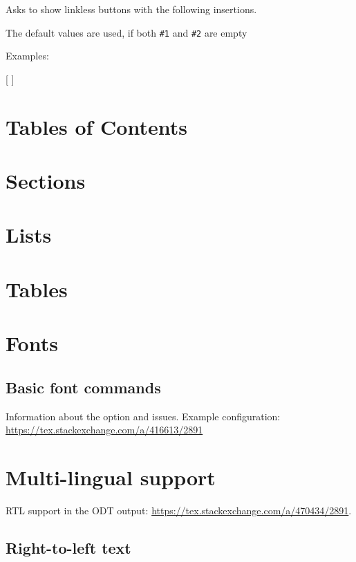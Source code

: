\documentclass{book}
\begin{document}
Asks to show linkless buttons with the following insertions.

The default values are used, if both \verb|#1| and \verb|#2| are empty

   Examples:

\begin{texsource}

    {[}
    {] }
\end{texsource}

\section{Tables of Contents}

\section{Sections}
\section{Lists}
\section{Tables}

\section{Fonts}
\subsection{Basic font commands}

Information about the  option and  issues. 
Example configuration:
\url{https://tex.stackexchange.com/a/416613/2891}

\section{Multi-lingual support}

RTL support in the ODT output: \url{https://tex.stackexchange.com/a/470434/2891}.

\subsection{Right-to-left text}
\end{document}
